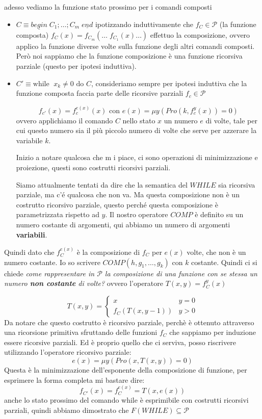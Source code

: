 \documentclass{article}
\begin{document}
adesso vediamo la funzione stato prossimo per i comandi composti
\begin{itemize}
    \item $C\equiv \underline{begin}\;C_1;\dots;C_m\;\underline{end}$
          ipotizzando induttivamente che $f_C\in\mathcal{P}$ (la funzione composta)
          $f_C(x)=f_{C_m}(\dots\;f_{C_1}(x)\dots)$
          effettuo la composizione, ovvero applico la funzione diverse volte sulla funzione degli
          altri comandi composti. Però noi sappiamo che la funzione composizione è una funzione
          ricorsiva parziale (questo per ipotesi induttiva).

    \item $C'\equiv\text{while }\;x_k\neq 0\text{ do }C$, consideriamo sempre per ipotesi
          induttiva che la funzione composta faccia parte delle ricorsive parziali $f_c\in\mathcal{P}$

          $$f_{c'}(x)=f_c^{e(x)}(x)\text{ con }e(x)=\mu y(Pro(k,f_c^y(x))=0)$$
          ovvero applichiamo il comando $C$ nello stato $x$ un numero $e$ di volte, tale per cui
          questo numero sia il più piccolo numero di volte che serve per azzerare la variabile $k$.

          Inizio a notare qualcosa che m i piace, ci sono operazioni di minimizzazione e proiezione,
          questi sono costrutti ricorsivi parziali.

          Siamo attualmente tentati da dire che la semantica del $WHILE$ sia ricorsiva parziale, ma
          c'é qualcosa che non va. Ma questa composizione non è un costrutto ricorsivo parziale, questo
          perché questa composizione è parametrizzata rispetto ad $y$. Il nostro operatore $COMP$ è definito
          su un numero costante di argomenti, qui abbiamo un numero di argomenti \textbf{variabili}.
\end{itemize}

Quindi dato che $f_C^{e(x)}$ è la composizione di $f_C$ per $e(x)$ volte, che non è un numero
costante. Io so scrivere $COMP(h,g_1,\dots,g_k)$ con $k$ costante. Quindi ci si chiede
\textit{come rappresentare in $\mathcal{P}$ la composizione di una funzione con se stessa
    un numero \textbf{non costante} di volte?} ovvero l'operatore $T(x,y)=f_C^y(x)$

\[
    T(x,y)=
    \begin{cases}
        x             & y=0 \\
        f_C(T(x,y-1)) & y>0
    \end{cases}
\]
Da notare che questo costrutto è ricorsivo parziale, perchè è ottenuto attraverso una
ricorsione primitiva sfruttando delle funzioni $f_C$ che sappiamo per induzione essere ricorsive
parziali. Ed è proprio quello che ci serviva, posso riscrivere utilizzando l'operatore
ricorsivo parziale:
$$e(x)=\mu y(Pro(x,T(x,y))=0)$$
Questa è la minimizzazione dell'esponente della composizione di funzione, per esprimere
la forma completa mi bastare dire:
$$f_{C'}(x)=f_C^{e(x)}=T(x,e(x))$$
anche lo stato prossimo del comando while è esprimibile con costrutti ricorsivi parziali, quindi
abbiamo dimostrato che $F(WHILE)\subseteq\mathcal{P}$
\end{document}
